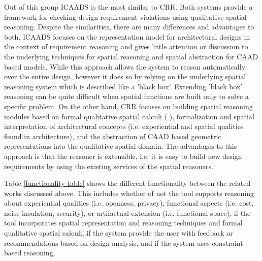 \documentclass[12pt]{ucthesis}
\begin{document}
Out of this group ICAADS is the most similar to CRR. Both systems provide a framework for checking design requirement violations using qualitative spatial reasoning. Despite the similarities, there are many differences and advantages to both. ICAADS focuses on the representation model for architectural designs in the context of requirement reasoning and gives little attention or discussion to the underlying techniques for spatial reasoning and spatial abstraction for CAAD based models. While this approach allows the system to reason automatically over the entire design, however it does so by relying on the underlying spatial reasoning system which is described like a 'black box'. Extending 'black box' reasoning can be quite difficult when spatial functions are built only to solve a specific problem. On the other hand, CRR focuses on building spatial reasoning modules based on formal qualitative spatial calculi (\cite{scc} \cite{opra} \cite{topolog}), formalization and spatial interpretation of architectural concepts (i.e. experiential and spatial qualities found in architecture), and the abstraction of CAAD based geometric representations into the qualitative spatial domain. The advantages to this approach is that the reasoner is extensible, i.e. it is easy to build new design requirements by using the existing services of the spatial reasoners.  

Table \ref{functionality table} shows the different functionality between the related works discussed above. This includes whether of not the tool supports reasoning about experiential qualities (i.e. openness, privacy), functional aspects (i.e. cost, noise insulation, security), or artifactual extension (i.e. functional space), if the tool incorporates spatial representation and reasoning techniques and formal qualitative spatial calculi, if the system provide the user with feedback or recommendations based on design analysis, and if the system uses constraint based reasoning.
\end{document}
